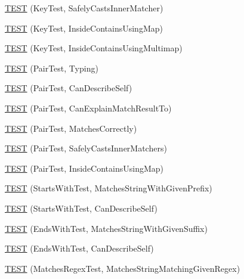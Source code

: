 \begin{DoxyCompactItemize}
\item 
\hyperlink{namespacetesting_1_1gmock__matchers__test_a6b05d274d57a4aa120bb497c34ce3a68}{T\+E\+ST} (Key\+Test, Safely\+Casts\+Inner\+Matcher)
\item 
\hyperlink{namespacetesting_1_1gmock__matchers__test_af9f4e295413489a7e3acafc59584c3c4}{T\+E\+ST} (Key\+Test, Inside\+Contains\+Using\+Map)
\item 
\hyperlink{namespacetesting_1_1gmock__matchers__test_af90ca00690094484af6c34eadf4dd7c3}{T\+E\+ST} (Key\+Test, Inside\+Contains\+Using\+Multimap)
\item 
\hyperlink{namespacetesting_1_1gmock__matchers__test_a5689064ea3fe50424dd1ea036d107aa8}{T\+E\+ST} (Pair\+Test, Typing)
\item 
\hyperlink{namespacetesting_1_1gmock__matchers__test_a672ba279448f634fae495ed7dc9260bd}{T\+E\+ST} (Pair\+Test, Can\+Describe\+Self)
\item 
\hyperlink{namespacetesting_1_1gmock__matchers__test_a4ee8f3967e3658cd7bd340558922f131}{T\+E\+ST} (Pair\+Test, Can\+Explain\+Match\+Result\+To)
\item 
\hyperlink{namespacetesting_1_1gmock__matchers__test_acdb02e9ac603c91b35602751f6a81239}{T\+E\+ST} (Pair\+Test, Matches\+Correctly)
\item 
\hyperlink{namespacetesting_1_1gmock__matchers__test_ad2110445fe8f2f8ca947540f2a400228}{T\+E\+ST} (Pair\+Test, Safely\+Casts\+Inner\+Matchers)
\item 
\hyperlink{namespacetesting_1_1gmock__matchers__test_a9785412a9e786b1f81387204df577c73}{T\+E\+ST} (Pair\+Test, Inside\+Contains\+Using\+Map)
\item 
\hyperlink{namespacetesting_1_1gmock__matchers__test_ac8a66c592ff57cce28b6f1d5211fd370}{T\+E\+ST} (Starts\+With\+Test, Matches\+String\+With\+Given\+Prefix)
\item 
\hyperlink{namespacetesting_1_1gmock__matchers__test_a492143bbe0627c563c5d0c65bf3f4d5b}{T\+E\+ST} (Starts\+With\+Test, Can\+Describe\+Self)
\item 
\hyperlink{namespacetesting_1_1gmock__matchers__test_ac3d41540d2ae7956d33c9eae1be67d91}{T\+E\+ST} (Ends\+With\+Test, Matches\+String\+With\+Given\+Suffix)
\item 
\hyperlink{namespacetesting_1_1gmock__matchers__test_a80da065ed9f5fb87add88ae2bc14056d}{T\+E\+ST} (Ends\+With\+Test, Can\+Describe\+Self)
\item 
\hyperlink{namespacetesting_1_1gmock__matchers__test_a5983e981b59498c6427ddb183c414bb7}{T\+E\+ST} (Matches\+Regex\+Test, Matches\+String\+Matching\+Given\+Regex)

\end{DoxyCompactItemize}
